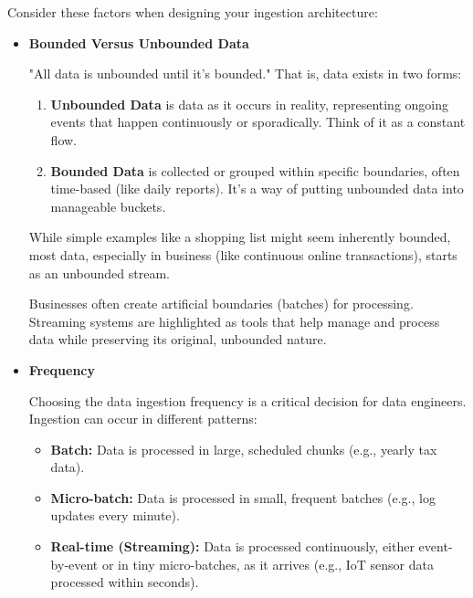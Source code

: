 Consider these factors when designing your ingestion architecture:
\begin{itemize}
    \item \textbf{Bounded Versus Unbounded Data}
    
    \noindent
    "All data is unbounded until it's bounded." That is, data exists
    in two forms:
    \begin{enumerate}
        \item \textbf{Unbounded Data} is data as it occurs in reality,
        representing ongoing events that happen continuously or
        sporadically. Think of it as a constant flow.
        
        \item \textbf{Bounded Data} is collected or grouped within
        specific boundaries, often time-based (like daily reports).
        It's a way of putting unbounded data into manageable buckets.

    \end{enumerate}
    While simple examples like a shopping list might seem
    inherently bounded, most data, especially in business
    (like continuous online transactions),
    starts as an unbounded stream.
    
    Businesses often create artificial boundaries (batches) for
    processing. Streaming systems are highlighted as tools that
    help manage and process data while preserving its original,
    unbounded nature.

    \item \textbf{Frequency}
    
    \noindent
    Choosing the data ingestion frequency is a critical decision for
    data engineers. Ingestion can occur in different patterns:
    \begin{itemize}
        \item \textbf{Batch:} Data is processed in large, scheduled
        chunks (e.g., yearly tax data).

        \item \textbf{Micro-batch:} Data is processed in small,
        frequent batches (e.g., log updates every minute).

        \item \textbf{Real-time (Streaming):} Data is processed
        continuously, either event-by-event or in tiny
        micro-batches, as it arrives (e.g., IoT sensor data
        processed within seconds).
    \end{itemize}
    

\end{itemize}
